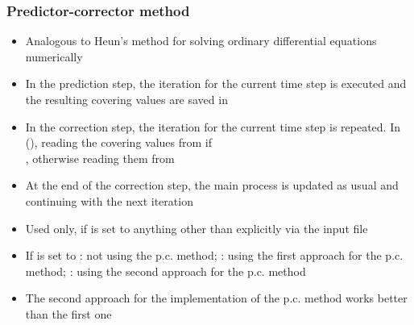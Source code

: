 
\subsubsection{Predictor-corrector method}
\begin{itemize}[noitemsep,topsep=0pt, partopsep=0pt]
\item{Analogous to Heun's method for solving ordinary differential equations numerically}
\item{In the prediction step, the iteration for the current time step is executed and the resulting covering values are saved in }
\item{In the correction step, the iteration for the current time step is repeated. In  (), reading the covering values from  if\\, otherwise reading them from }
\item{At the end of the correction step, the main process is updated as usual and continuing with the next iteration}
\item{Used only, if  is set to anything other than  explicitly via the input file}
\item{If  is set to :  not using the p.c. method; :  using the first approach for the p.c. method; :  using the second approach for the p.c. method}
\item{The second approach for the implementation of the p.c. method works better than the first one}
\end{itemize}

